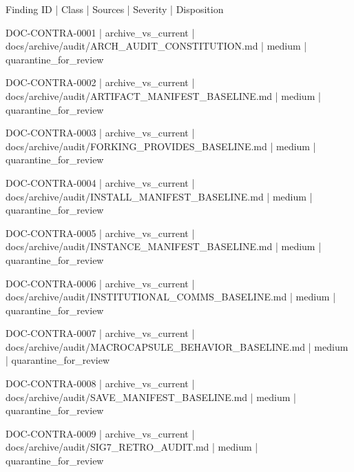 \documentclass[11pt,a4paper]{report}
\begin{document}
{\small\ttfamily\raggedright Finding ID | Class | Sources | Severity | Disposition\par}
{\small\ttfamily\raggedright DOC-\allowbreak{}CONTRA-\allowbreak{}0001 | archive\_vs\_current | docs/\allowbreak{}archive/\allowbreak{}audit/\allowbreak{}ARCH\_AUDIT\_CONSTITUTION.\allowbreak{}md | medium | quarantine\_for\_review\par}
{\small\ttfamily\raggedright DOC-\allowbreak{}CONTRA-\allowbreak{}0002 | archive\_vs\_current | docs/\allowbreak{}archive/\allowbreak{}audit/\allowbreak{}ARTIFACT\_MANIFEST\_BASELINE.\allowbreak{}md | medium | quarantine\_for\_review\par}
{\small\ttfamily\raggedright DOC-\allowbreak{}CONTRA-\allowbreak{}0003 | archive\_vs\_current | docs/\allowbreak{}archive/\allowbreak{}audit/\allowbreak{}FORKING\_PROVIDES\_BASELINE.\allowbreak{}md | medium | quarantine\_for\_review\par}
{\small\ttfamily\raggedright DOC-\allowbreak{}CONTRA-\allowbreak{}0004 | archive\_vs\_current | docs/\allowbreak{}archive/\allowbreak{}audit/\allowbreak{}INSTALL\_MANIFEST\_BASELINE.\allowbreak{}md | medium | quarantine\_for\_review\par}
{\small\ttfamily\raggedright DOC-\allowbreak{}CONTRA-\allowbreak{}0005 | archive\_vs\_current | docs/\allowbreak{}archive/\allowbreak{}audit/\allowbreak{}INSTANCE\_MANIFEST\_BASELINE.\allowbreak{}md | medium | quarantine\_for\_review\par}
{\small\ttfamily\raggedright DOC-\allowbreak{}CONTRA-\allowbreak{}0006 | archive\_vs\_current | docs/\allowbreak{}archive/\allowbreak{}audit/\allowbreak{}INSTITUTIONAL\_COMMS\_BASELINE.\allowbreak{}md | medium | quarantine\_for\_review\par}
{\small\ttfamily\raggedright DOC-\allowbreak{}CONTRA-\allowbreak{}0007 | archive\_vs\_current | docs/\allowbreak{}archive/\allowbreak{}audit/\allowbreak{}MACROCAPSULE\_BEHAVIOR\_BASELINE.\allowbreak{}md | medium | quarantine\_for\_review\par}
{\small\ttfamily\raggedright DOC-\allowbreak{}CONTRA-\allowbreak{}0008 | archive\_vs\_current | docs/\allowbreak{}archive/\allowbreak{}audit/\allowbreak{}SAVE\_MANIFEST\_BASELINE.\allowbreak{}md | medium | quarantine\_for\_review\par}
{\small\ttfamily\raggedright DOC-\allowbreak{}CONTRA-\allowbreak{}0009 | archive\_vs\_current | docs/\allowbreak{}archive/\allowbreak{}audit/\allowbreak{}SIG7\_RETRO\_AUDIT.\allowbreak{}md | medium | quarantine\_for\_review\par}
\end{document}

